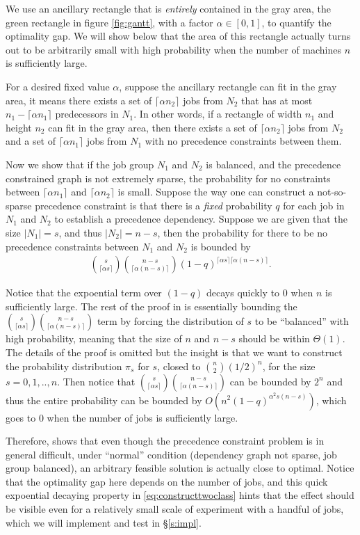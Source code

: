 We use an ancillary rectangle that is \emph{entirely} contained in the gray area, the green rectangle in figure \ref{fig:gantt}, with a factor $\alpha \in [0,1]$, to quantify the optimality gap. We will show below that the area of this rectangle actually turns out to be arbitrarily small with high probability when the number of machines $n$ is sufficiently large. 

For a desired fixed value $\alpha$, suppose the ancillary rectangle can fit in the gray area, it means there exists a set of $\lceil\alpha n_2\rceil$ jobs from $N_2$ that has at most $n_1 - \lceil\alpha n_1\rceil$ predecessors in $N_1$. In other words, if a rectangle of width $n_1$ and height $n_2$ can fit in the gray area, then there exists a set of $\lceil\alpha n_2\rceil$ jobs from $N_2$ and a set of $\lceil\alpha n_1\rceil$  jobs from $N_1$ with no precedence constraints between them.

Now we show that if the job group $N_1$ and $N_2$ is balanced, and the precedence constrained graph is not extremely sparse, the probability for no constraints between $\lceil\alpha n_1\rceil$ and $\lceil\alpha n_2\rceil$ is small. Suppose the way one can construct a not-so-sparse precedence constraint is that there is a \emph{fixed} probability $q$ for each job in $N_1$ and $N_2$ to establish a precedence dependency. Suppose we are given that the size $|N_1| = s$, and thus $|N_2| = n-s$, then the probability for there to be no precedence constraints between $N_1$ and $N_2$ is bounded by
\begin{align}
{s \choose \lceil\alpha s\rceil}{n-s \choose \lceil\alpha (n-s)\rceil}(1-q)^{ \lceil\alpha s\rceil \lceil\alpha (n-s)\rceil}. \label{eq:constructtwoclass}
\end{align}

Notice that the expoential term over $(1-q)$ decays quickly to $0$ when $n$ is sufficiently large. The rest of the proof in \cite{schulz2011near} is essentially bounding the ${s \choose \lceil\alpha s\rceil}{n-s \choose \lceil\alpha (n-s)\rceil}$ term by forcing the distribution of $s$ to be ``balanced'' with high probability, meaning that the size of $n$ and $n-s$ should be within $\Theta(1)$. The details of the proof is omitted but the insight is that we want to construct the probability distribution $\pi_s$ for $s$, closed to ${n \choose 2} (1/2)^n$, for the size $s=0,1,..,n$. Then notice that ${s \choose \lceil\alpha s\rceil}{n-s \choose \lceil\alpha (n-s)\rceil}$ can be bounded by $2^n$ and thus the entire probability can be bounded by $O(n^2 (1-q)^{\alpha^2 s(n-s)})$, which goes to 0 when the number of jobs is sufficiently large. 

Therefore, \cite{schulz2011near} shows that even though the precedence constraint problem is in general difficult, under ``normal'' condition (dependency graph not sparse, job group balanced), an arbitrary feasible solution is actually close to optimal. Notice that the optimality gap here depends on the number of jobs, and this quick expoential decaying property in \eqref{eq:constructtwoclass} hints that the effect should be visible even for a relatively small scale of experiment with a handful of jobs, which we will implement and test in \S\ref{s:impl}. 